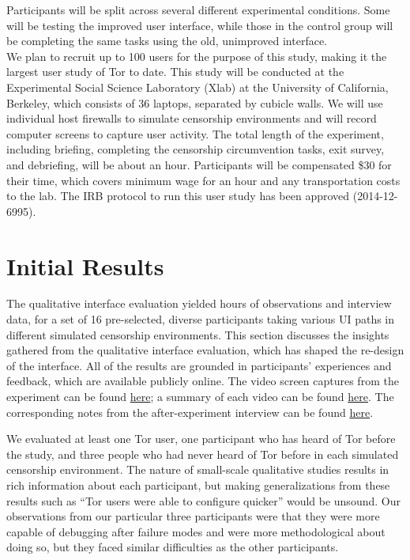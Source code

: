 \documentclass{template}
\begin{document}
Participants will be split across several different experimental conditions.
Some will be testing the improved user interface, while those in the control
group will be completing the same tasks using the old, unimproved interface. \\

We plan to recruit up to 100 users for the purpose of this study,
making it the largest user study of Tor to date.  This study will be conducted at the
Experimental Social Science Laboratory (Xlab)
at the University of California, Berkeley, which consists of 36 laptops,
separated by cubicle walls. We will use individual host firewalls to simulate
censorship environments and will record computer screens to capture 
user activity. The total length of the experiment, including briefing, completing the censorship 
circumvention tasks, exit survey, and debriefing, will be about an hour.
Participants will be compensated \$30 for their time, which covers
minimum wage for an hour and any transportation costs to the lab. 
The IRB protocol to run this user study has been approved (2014-12-6995). 

\section{Initial Results}

The qualitative interface evaluation yielded hours of observations and
interview data, for a set of 16 pre-selected, diverse participants taking
various UI paths in different simulated censorship environments. This section
discusses the insights gathered from the qualitative interface evaluation, which
has shaped the re-design of the interface. All of the results are grounded in
participants' experiences and feedback, which are available publicly online. The
video screen captures from the experiment can be found
\href{https://github.com/lindanlee/circumvention-ux-tor/tree/master/sessions/pre/videos}{here};
a summary of each video can be found
\href{https://github.com/lindanlee/circumvention-ux-tor/blob/master/sessions/pre/participant-summaries.txt}{here}.
The corresponding notes from the after-experiment interview can be found
\href{https://github.com/lindanlee/circumvention-ux-tor/tree/master/sessions/pre/notes}{here}. 

We evaluated at least one Tor user, one participant who has heard of Tor before the study, and three people who had never heard of Tor before in each simulated censorship environment. The nature of small-scale qualitative studies results in rich information about each participant, but making generalizations from these results such as ``Tor users were able to configure quicker'' would be unsound. Our observations from our particular three participants were that they were more capable of debugging after failure modes and were more methodological about doing so, but they faced similar difficulties as the other participants. 
\end{document}
